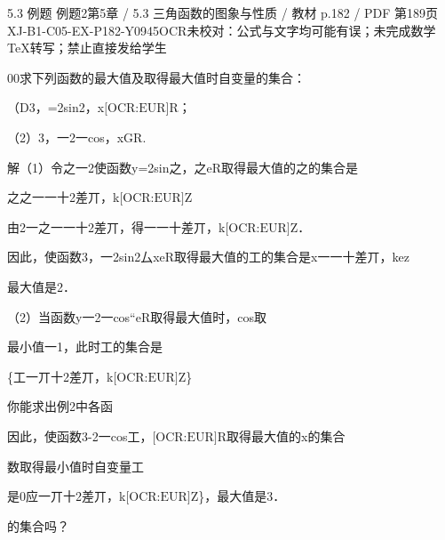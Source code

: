 \begin{bankitem}{5.3 例题 例题2}{第5章 / 5.3 三角函数的图象与性质 / 教材 p.182 / PDF 第189页}{XJ-B1-C05-EX-P182-Y0945}{OCR未校对：公式与文字均可能有误；未完成数学TeX转写；禁止直接发给学生}
\begin{ocrdraft}
\par
00求下列函数的最大值及取得最大值时自变量的集合：
\par
（D3，=2sin2，x\ensuremath{\text{[OCR:EUR]}}R；
\par
（2）3，一2一cos，xGR.
\par
解（1）令之一2使函数y=2sin之，之eR取得最大值的之的集合是
\par
之之一一十2差丌，k\ensuremath{\text{[OCR:EUR]}}Z
\par
由2一之一一十2差丌，得一一十差丌，k\ensuremath{\text{[OCR:EUR]}}Z．
\par
因此，使函数3，一2sin2厶xeR取得最大值的工的集合是x一一十差丌，kez
\par
最大值是2．
\par
（2）当函数y一2一cos“eR取得最大值时，cos取
\par
最小值一1，此时工的集合是
\par
\{工一丌十2差丌，k\ensuremath{\text{[OCR:EUR]}}Z\}
\par
你能求出例2中各函
\par
因此，使函数3-2一cos工，\ensuremath{\text{[OCR:EUR]}}R取得最大值的x的集合
\par
数取得最小值时自变量工
\par
是0应一丌十2差丌，k\ensuremath{\text{[OCR:EUR]}}Z\}，最大值是3．
\par
的集合吗？
\end{ocrdraft}
\end{bankitem}
